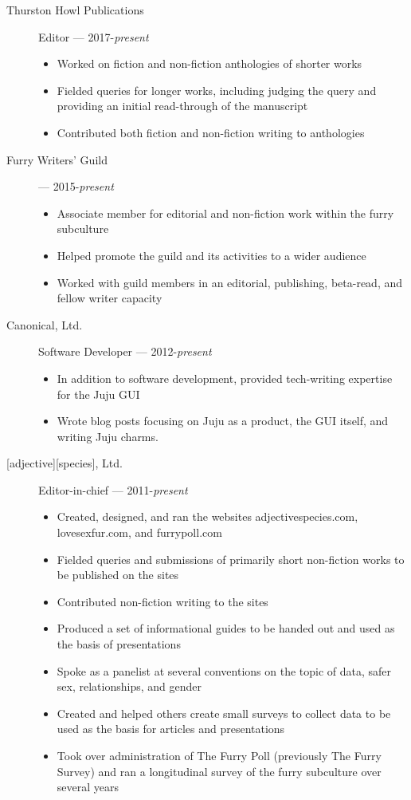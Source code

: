\documentclass[letterpaper]{memoir}
\begin{document}
\begin{description}
\item[Thurston Howl Publications]
Editor --- 2017-\emph{present}

\begin{itemize}
\item
  Worked on fiction and non-fiction anthologies of shorter works
\item
  Fielded queries for longer works, including judging the query and
  providing an initial read-through of the manuscript
\item
  Contributed both fiction and non-fiction writing to anthologies
\end{itemize}
\item[Furry Writers' Guild] --- 2015-\emph{present}

\begin{itemize}
  \item Associate member for editorial and non-fiction work within the furry subculture
  \item Helped promote the guild and its activities to a wider audience
  \item Worked with guild members in an editorial, publishing, beta-read, and fellow writer capacity
\end{itemize}
\item[Canonical, Ltd.]
Software Developer --- 2012-\emph{present}

\begin{itemize}
\item
  In addition to software development, provided tech-writing expertise
  for the Juju GUI
\item
  Wrote blog posts focusing on Juju as a product, the GUI itself, and
  writing Juju charms.
\end{itemize}
\item[{[}adjective{]}{[}species{]}, Ltd.]
Editor-in-chief --- 2011-\emph{present}

\begin{itemize}
\item
  Created, designed, and ran the websites adjectivespecies.com,
  lovesexfur.com, and furrypoll.com
\item
  Fielded queries and submissions of primarily short non-fiction works
  to be published on the sites
\item
  Contributed non-fiction writing to the sites
\item
  Produced a set of informational guides to be handed out and used as
  the basis of presentations
\item
  Spoke as a panelist at several conventions on the topic of data, safer
  sex, relationships, and gender
\item
  Created and helped others create small surveys to collect data to be
  used as the basis for articles and presentations
\item
  Took over administration of The Furry Poll (previously The Furry
  Survey) and ran a longitudinal survey of the furry subculture over
  several years
\end{itemize}
\end{description}
\end{document}
